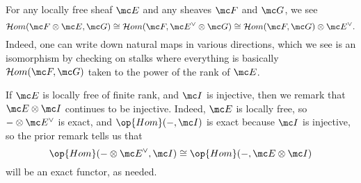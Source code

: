 \documentclass[../notes.tex]{subfiles}
\begin{document}
\begin{remark}
	For any locally free sheaf $\mc E$ and any sheaves $\mc F$ and $\mc G$, we see
	\[\mathcal Hom(\mc F\otimes\mc E,\mc G)\cong\mathcal Hom(\mc F,\mc E^\lor\otimes\mc G)\cong\mathcal Hom(\mc F,\mc G)\otimes\mc E^\lor.\]
	Indeed, one can write down natural maps in various directions, which we see is an isomorphism by checking on stalks where everything is basically $\mathcal Hom(\mc F,\mc G)$ taken to the power of the rank of $\mc E$.
\end{remark}
\begin{remark}
	If $\mc E$ is locally free of finite rank, and $\mc I$ is injective, then we remark that $\mc E\otimes\mc I$ continues to be injective. Indeed, $\mc E$ is locally free, so $-\otimes\mc E^\lor$ is exact, and $\op{Hom}(-,\mc I)$ is exact because $\mc I$ is injective, so the prior remark tells us that
	\[\op{Hom}(-\otimes\mc E^\lor,\mc I)\cong\op{Hom}(-,\mc E\otimes\mc I)\]
	will be an exact functor, as needed.
\end{remark}
\end{document}

